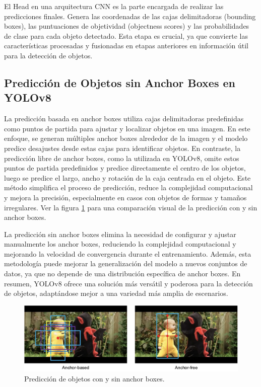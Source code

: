 El Head en una arquitectura CNN es la parte encargada de realizar las predicciones finales. Genera las coordenadas de las cajas delimitadoras (bounding boxes), las puntuaciones de objetividad (objectness scores) y las probabilidades de clase para cada objeto detectado. Esta etapa es crucial, ya que convierte las características procesadas y fusionadas en etapas anteriores en información útil para la detección de objetos.

\subsection{Predicción de Objetos sin Anchor Boxes en YOLOv8}
La predicción basada en anchor boxes utiliza cajas delimitadoras predefinidas como puntos de partida para ajustar y localizar objetos en una imagen. En este enfoque, se generan múltiples anchor boxes alrededor de la imagen y el modelo predice desajustes desde estas cajas para identificar objetos. En contraste, la predicción libre de anchor boxes, como la utilizada en YOLOv8, omite estos puntos de partida predefinidos y predice directamente el centro de los objetos, luego se predice el largo, ancho y rotación de la caja centrada en el objeto. Este método simplifica el proceso de predicción, reduce la complejidad computacional y mejora la precisión, especialmente en casos con objetos de formas y tamaños irregulares. Ver la figura \ref{fig:anchor-box-free} para una comparación visual de la predicción con y sin anchor boxes.

La predicción sin anchor boxes elimina la necesidad de configurar y ajustar manualmente los anchor boxes, reduciendo la complejidad computacional y mejorando la velocidad de convergencia durante el entrenamiento. Además, esta metodología puede mejorar la generalización del modelo a nuevos conjuntos de datos, ya que no depende de una distribución específica de anchor boxes. En resumen, YOLOv8 ofrece una solución más versátil y poderosa para la detección de objetos, adaptándose mejor a una variedad más amplia de escenarios.

\begin{figure}[H]
    \centering
    \includegraphics[width=1\textwidth]{../img/anchorfree-vs-anchorbox.png}
    \caption{Predicción de objetos con y sin anchor boxes.}
    \label{fig:anchor-box-free}
\end{figure}

